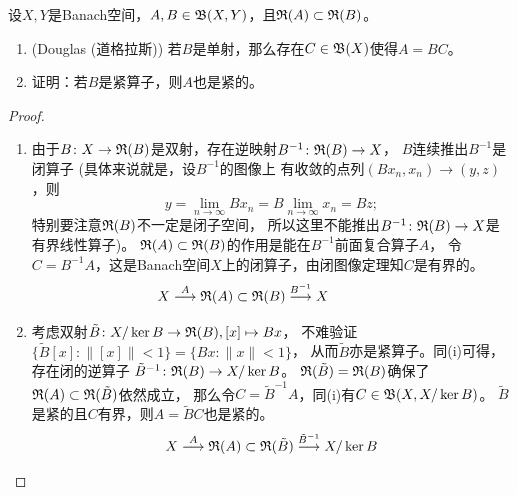 \begin{10}
    设$X,Y$是Banach空间，$A,B\in\mathfrak{B}(X,Y)$，且$\mathfrak{R}(A)\subset\mathfrak{R}(B)$。
    \begin{enumerate}[label=(\roman*)]
        \item (Douglas (道格拉斯)) 若$B$是单射，那么存在$C\in\mathfrak{B}(X)$使得$A=BC$。
        \item 证明：若$B$是紧算子，则$A$也是紧的。
    \end{enumerate}
\end{10}
\begin{proof}
    \begin{enumerate}[label=(\roman*)]
    \item 由于$B\colon X\to\mathfrak{R}(B)$是双射，存在逆映射$B^{-1}\colon\mathfrak{R}(B)\to X$，
    $B$连续推出$B^{-1}$是闭算子 (具体来说就是，设$B^{-1}$的图像上
    有收敛的点列$(Bx_n,x_n)\to(y,z)$，则
    \[y=\lim_{n\to\infty}Bx_n=B\lim_{n\to\infty}x_n=Bz;\]
    特别要注意$\mathfrak{R}(B)$不一定是闭子空间，
    所以这里不能推出$B^{-1}\colon\mathfrak{R}(B)\to X$是有界线性算子)。
    $\mathfrak{R}(A)\subset\mathfrak{R}(B)$的作用是能在$B^{-1}$前面复合算子$A$，
    令$C=B^{-1}A$，这是Banach空间$X$上的闭算子，由闭图像定理知$C$是有界的。
    \[X\stackrel{A}{\longrightarrow}\rr(A)\subset\rr(B)
    \stackrel{B^{-1}}{\longrightarrow}X\qquad\quad{\ \ \ }\]
    \item 考虑双射$\tilde{B}\colon X/\ker B\to\mathfrak{R}(B),[x]\mapsto Bx$，
    不难验证$\{\tilde{B}[x]:\|[x]\|<1\}=\{Bx:\|x\|<1\}$，
    从而$\tilde{B}$亦是紧算子。同(i)可得，存在闭的逆算子
    $\tilde{B}^{-1}\colon\mathfrak{R}(B)\to X/\ker B$。
    $\mathfrak{R}(\tilde{B})=\mathfrak{R}(B)$确保了$\mathfrak{R}(A)\subset\mathfrak{R}(\tilde{B})$依然成立，
    那么令$C=\tilde{B}^{-1}A$，同(i)有$C\in\mathfrak{B}(X,X/\ker B)$。
    $\tilde{B}$是紧的且$C$有界，则$A=\tilde{B}C$也是紧的。
    \[X\stackrel{A}{\longrightarrow}\mathfrak{R}(A)\subset\mathfrak{R}(\tilde{B})
    \stackrel{\tilde{B}^{-1}}{\longrightarrow}X/\ker B\qedhere\]
    \end{enumerate}
\end{proof}

